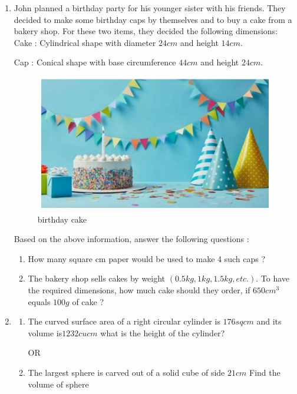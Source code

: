\documentclass{article}
\begin{document}
\begin{enumerate}
\item John planned a birthday party for his younger sister with his friends. They decided to make some birthday caps by themselves and to buy a cake from a bakery shop. For these two items, they decided the following dimensions:
\\
Cake : Cylindrical shape with diameter $24 cm$ and height $14 cm.$

Cap : Conical shape with base circumference $44 cm$ and height $24 cm.$
\begin{figure}[H]
    \centering
    \includegraphics[width=\columnwidth]{figs/birthday cake.png}
    \caption{birthday cake}
    \label{tab:birthday cake}
\end{figure}
Based on the above information, answer the following questions :
\begin{enumerate}
    \item How many square cm paper would be used to make 4 such caps ?
    \item The bakery shop sells cakes by weight $(0.5 kg, 1 kg, 1.5 kg, etc.).$ To have the required dimensions, how much cake should they order, if $650 cm^3$ equals $100 g$ of cake ?
\end{enumerate}
\newpage
\item 
\begin{enumerate}
    \item The curved surface area of a right circular cylinder is $176 sq cm$ and its volume is$1232 cu cm$ what is the height of the cylinder?
    \begin{center}
        OR
    \end{center}
    \item The largest sphere is carved out of a solid cube of side $21cm$ Find the volume of sphere
\end{enumerate}

\end{enumerate}
\end{document}
